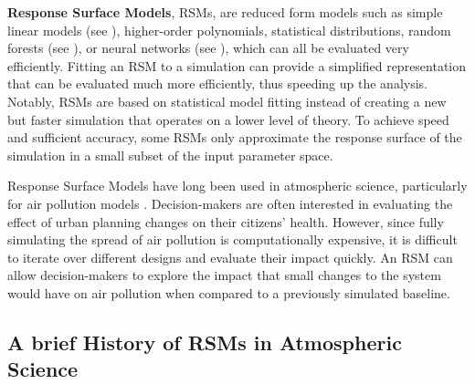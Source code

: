 \textbf{Response Surface Models}, RSMs, are reduced form models \cite{emission-rsm-2022} such as simple linear models (see ), higher-order polynomials, statistical distributions, random forests (see ), or neural networks (see ), which can all be evaluated very efficiently. Fitting an RSM to a simulation can provide a simplified representation that can be evaluated much more efficiently, thus speeding up the analysis. Notably, RSMs are based on statistical model fitting instead of creating a new but faster simulation that operates on a lower level of theory. To achieve speed and sufficient accuracy, some RSMs only approximate the response surface of the simulation in a small subset of the input parameter space.

Response Surface Models have long been used in atmospheric science, particularly for air pollution models \cite{emission-rsm-2022}. Decision-makers are often interested in evaluating the effect of urban planning changes on their citizens' health. However, since fully simulating the spread of air pollution is computationally expensive, it is difficult to iterate over different designs and evaluate their impact quickly. An RSM can allow decision-makers to explore the impact that small changes to the system would have on air pollution when compared to a previously simulated baseline.

\subsection{A brief History of RSMs in Atmospheric Science} \label{txt:rsm-history}


